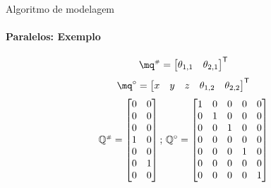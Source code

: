 \documentclass[25pt,landscape]{beamer}
\begin{document}
\begin{frame}{Algoritmo de modelagem}
    \framesubtitle{Paralelos: Exemplo}
    $$ \mq\ssh = 
		\begin{bmatrix}
			\theta_{1,1} &
			\theta_{2,1} 
		\end{bmatrix}^\msT
	$$
	$$ \mq\cir = 
		\begin{bmatrix}
			x &
			y &
			z &
			\theta_{1,2} &
			\theta_{2,2} 
		\end{bmatrix}^\msT
	$$
	\pause
	$$ \mathbb{Q}^{\scriptscriptstyle \#} =
		\begin{bmatrix}
			0 & 0 \\
			0 & 0 \\
			0 & 0 \\
			1 & 0 \\
			0 & 0 \\
			0 & 1 \\
			0 & 0 \\
		\end{bmatrix}; \,
		\mathbb{Q}^{\scriptstyle \circ} =
		\begin{bmatrix}
			1 & 0 & 0 & 0 & 0 \\
			0 & 1 & 0 & 0 & 0 \\
			0 & 0 & 1 & 0 & 0 \\
			0 & 0 & 0 & 0 & 0 \\
			0 & 0 & 0 & 1 & 0 \\
			0 & 0 & 0 & 0 & 0 \\
			0 & 0 & 0 & 0 & 1 \\
		\end{bmatrix} $$
\end{frame}

\end{document}
